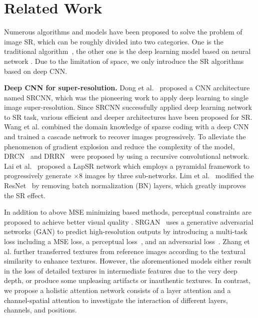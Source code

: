 \documentclass[runningheads]{llncs}
\begin{document}
\section{Related Work}
Numerous algorithms and models have been proposed to solve the problem of image SR, which can be roughly divided into two categories. One is the traditional algorithm~\cite {yang2008image,huang2018robust,huang2015single}, the other one is the deep learning model based on neural network \cite{kim2016accurate,dong2016accelerating,lai2017deep,lim2017enhanced,zhang2018residual,kim2016deeply,tai2017image,tai2017memnet}. Due to the limitation of space, we only introduce the SR algorithms based on deep CNN.\par   
\textbf{Deep CNN for super-resolution.} Dong et al.~\cite{dong2014learning} proposed a CNN architecture named SRCNN, which was the pioneering work to apply deep learning to single image super-resolution. 
Since SRCNN successfully applied deep learning network to SR task, various efficient and deeper architectures have been proposed for SR.
Wang et al. \cite{wang2015deep}combined the domain knowledge of sparse coding with a
deep CNN and trained a cascade network to recover images progressively.
To alleviate the phenomenon of gradient explosion and reduce the complexity of the model, DRCN~\cite{kim2016deeply} and DRRN~\cite{tai2017image} were proposed by using a recursive convolutional network.
Lai et al.~\cite{lai2017deep} proposed a LapSR network which employs a pyramidal framework to progressively generate $\times 8$ images by three sub-networks. 
Lim et al.~\cite{lim2017enhanced} modified the ResNet~\cite{he2016deep} by removing batch normalization (BN) layers, which greatly improves the SR effect.


In addition to above MSE minimizing based methods, perceptual constraints are proposed to achieve better visual quality \cite{sajjadi2017enhancenet}. 
SRGAN~\cite{ledig2017photo} uses a generative adversarial networks (GAN) to predict high-resolution outputs by introducing a multi-task loss including a MSE loss, a perceptual loss~\cite{johnson2016perceptual}, and an adversarial loss~\cite{NIPS2014_5423}.
Zhang et al. \cite{zhang2019image} further transferred textures from reference images according to the textural similarity to enhance textures.
However, the aforementioned models either result in the loss of detailed textures in intermediate features due to the very deep depth, or produce some unpleasing artifacts or inauthentic textures. 
In contrast, we propose a holistic attention network consists of a layer attention and a channel-spatial attention to investigate the interaction of different layers, channels, and positions.
\end{document}
